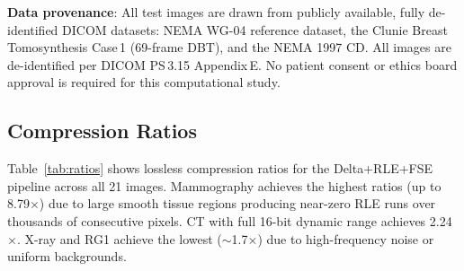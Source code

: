 \documentclass[10pt,twocolumn]{article}
\begin{document}
\textbf{Data provenance}: All test images are drawn from publicly available, fully de-identified DICOM datasets: NEMA WG-04 reference dataset, the Clunie Breast Tomosynthesis Case\,1 (69-frame DBT), and the NEMA 1997 CD. All images are de-identified per DICOM PS\,3.15 Appendix\,E. No patient consent or ethics board approval is required for this computational study.

\subsection{Compression Ratios}

Table~\ref{tab:ratios} shows lossless compression ratios for the Delta+RLE+FSE pipeline across all 21 images. Mammography achieves the highest ratios (up to 8.79$\times$) due to large smooth tissue regions producing near-zero RLE runs over thousands of consecutive pixels. CT with full 16-bit dynamic range achieves 2.24$\times$. X-ray and RG1 achieve the lowest ($\sim$1.7$\times$) due to high-frequency noise or uniform backgrounds.
\end{document}
